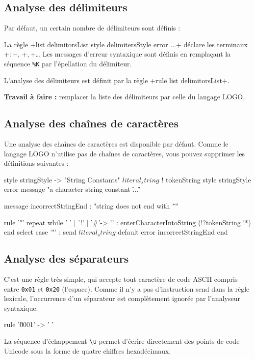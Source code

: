 \subsection{Analyse des délimiteurs}
Par défaut, un certain nombre de délimiteurs sont définis :


La règle \ggs+list delimitorsList style delimitersStyle error ...+ déclare les terminaux \ggs+$:$+, \ggs+$,$+… Les messages d'erreur syntaxique sont définis en remplaçant la séquence \texttt{\%K} par l’épellation du délimiteur.

L'analyse des délimiteurs est définit par la règle \ggs+rule list delimitorsList+.

\textbf{Travail à faire :} remplacer la liste des délimiteurs par celle du langage LOGO.

\subsection{Analyse des chaînes de caractères}
Une analyse des chaînes de caractères est disponible par défaut. Comme le langage LOGO n’utilise pas de chaînes de caractères, vous pouvez supprimer les définitions suivantes :

\begin{galgas}
style stringStyle -> "String Constants"
$literal_string$ ! tokenString style stringStyle %
                   error message "a character string constant \"...\""

message incorrectStringEnd : "string does not end with '\"'"

rule '"' {
  repeat
  while ' ' | '!' | '#'-> '\uFFFD' :
    enterCharacterIntoString (!?tokenString !*)
  end
  select
  case '"' :
    send $literal_string$
  default
    error incorrectStringEnd
  end
}
\end{galgas}

\subsection{Analyse des séparateurs}
C'est une règle très simple, qui accepte tout caractère de code ASCII compris entre \texttt{0x01} et \texttt{0x20} (l'espace). Comme il n'y a pas d'instruction send dans la règle lexicale, l'occurrence d'un séparateur est complètement ignorée par l'analyseur syntaxique.
\begin{galgas}
rule '\u0001' -> ' ' {
}
\end{galgas}
La séquence d'échappement \texttt{\textbackslash u} permet d'écrire directement des points de code Unicode sous la forme de quatre chiffres hexadécimaux.

